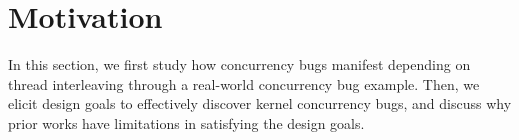 \section{Motivation}
\label{s:motivation}


%
In this section, we first study how concurrency bugs manifest
depending on thread interleaving through a real-world concurrency bug
example.  Then, we elicit design goals to effectively discover kernel
concurrency bugs, and discuss why prior works have limitations in
satisfying the design goals.

%


